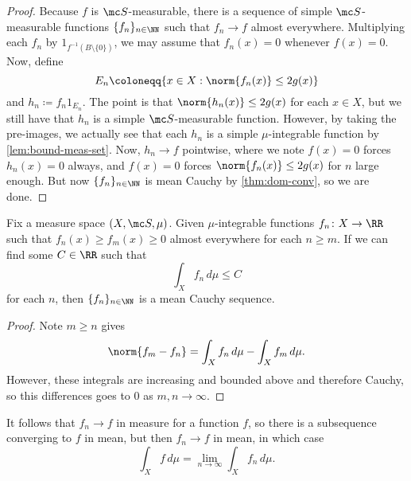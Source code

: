 \documentclass[../notes.tex]{subfiles}
\begin{document}
\begin{proof}
	Because $f$ is $\mc S$-measurable, there is a sequence of simple $\mc S$-measurable functions $\{f_n\}_{n\in\NN}$ such that $f_n\to f$ almost everywhere. Multiplying each $f_n$ by $1_{f^{-1}(B\setminus\{0\})}$, we may assume that $f_n(x)=0$ whenever $f(x)=0$. Now, define
	\[E_n\coloneqq\{x\in X:\norm{f_n(x)}\le2g(x)\}\]
	and $h_n\coloneqq f_n1_{E_n}$. The point is that $\norm{h_n(x)}\le2g(x)$ for each $x\in X$, but we still have that $h_n$ is a simple $\mc S$-measurable function. However, by taking the pre-images, we actually see that each $h_n$ is a simple $\mu$-integrable function by \autoref{lem:bound-meas-set}. Now, $h_n\to f$ pointwise, where we note $f(x)=0$ forces $h_n(x)=0$ always, and $f(x)=0$ forces $\norm{f_n(x)}\le2g(x)$ for $n$ large enough. But now $\{f_n\}_{n\in\NN}$ is mean Cauchy by \autoref{thm:dom-conv}, so we are done.
\end{proof}
\begin{theorem}
	Fix a measure space $(X,\mc S,\mu)$. Given $\mu$-integrable functions $f_n\colon X\to\RR$ such that $f_n(x)\ge f_m(x)\ge0$ almost everywhere for each $n\ge m$. If we can find some $C\in\RR$ such that
	\[\int_Xf_n\,d\mu\le C\]
	for each $n$, then $\{f_n\}_{n\in\NN}$ is a mean Cauchy sequence.
\end{theorem}
\begin{proof}
	Note $m\ge n$ gives
	\[\norm{f_m-f_n}=\int_Xf_n\,d\mu-\int_Xf_m\,d\mu.\]
	However, these integrals are increasing and bounded above and therefore Cauchy, so this differences goes to $0$ as $m,n\to\infty$.
\end{proof}
\begin{remark}
	It follows that $f_n\to f$ in measure for a function $f$, so there is a subsequence converging to $f$ in mean, but then $f_n\to f$ in mean, in which case
	\[\int_Xf\,d\mu=\lim_{n\to\infty}\int_Xf_n\,d\mu.\]
\end{remark}
\end{document}
